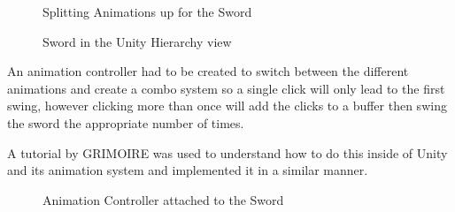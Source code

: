 \documentclass[11pt]{report}
\begin{document}
\begin{figure}[H]
    \begin{minipage}{.5\textwidth}
        \centering
        \caption{Splitting Animations up for the Sword}
    \end{minipage}
    \begin{minipage}{.5\textwidth}
        \centering
        \caption{Sword in the Unity Hierarchy view}
    \end{minipage}
\end{figure}

An animation controller had to be created to switch between the different animations and create a combo system so a single click will only lead to the first swing, however clicking more than once will add the clicks to a buffer then swing the sword the appropriate number of times.

A tutorial by GRIMOIRE \cite{comboSystem} was used to understand how to do this inside of Unity and its animation system and implemented it in a similar manner.

\begin{figure}[H]
    \centering
    \caption{Animation Controller attached to the Sword}
\end{figure}
\end{document}
